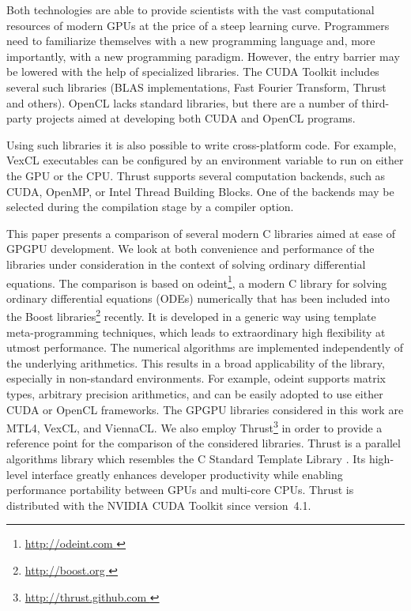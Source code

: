 \documentclass[final]{siamltex}
\newcommand{\addpp}[1]{{#1\nolinebreak[4]\hspace{-.05em}\raisebox{.4ex}{\tiny\bf ++}}\xspace}
\newcommand{\Cpp}{\addpp{C}}
\begin{document}
Both technologies are able to provide scientists with the vast computational
resources of modern GPUs at the price of a steep learning curve.  Programmers
need to familiarize themselves with a new programming language and, more
importantly, with a new programming paradigm. However, the entry barrier may be
lowered with the help of specialized libraries. The CUDA Toolkit includes
several such libraries (BLAS implementations, Fast Fourier Transform, Thrust
and others). OpenCL lacks standard libraries, but there are a number of
third-party projects aimed at developing both CUDA and OpenCL programs.

Using such libraries it is also possible to write cross-platform
code. For example, VexCL executables can be configured by an
environment variable to run on either the GPU or the CPU. Thrust supports
several computation backends, such as CUDA, OpenMP, or Intel Thread Building
Blocks. One of the backends may be selected during the compilation stage by a
compiler option.

This paper presents a comparison of several modern \Cpp libraries aimed at ease
of GPGPU development. We look at both convenience and performance of the
libraries under consideration in the context of solving ordinary differential
equations.  The comparison is based on odeint\footnote{\href{
http://odeint.com }{ http://odeint.com } }, a modern \Cpp library for solving
ordinary differential equations (ODEs) numerically  \cite{OdeintRef2,OdeintRef1}
that has been included into the Boost
libraries\footnote{ \href{ http://boost.org } { http://boost.org } } recently.
It is developed in a generic way using template meta-programming techniques,
which leads to extraordinary high flexibility at utmost performance. The
numerical algorithms are implemented independently of the underlying
arithmetics. This results in a broad applicability of the library, especially
in non-standard environments.  For example, odeint supports matrix types,
arbitrary precision arithmetics, and can be easily adopted to use either CUDA
or OpenCL frameworks.  The GPGPU libraries considered in this work are MTL4,
VexCL, and ViennaCL. We also employ Thrust\footnote{ \href{
http://thrust.github.com }{ http://thrust.github.com }} in order to provide a
reference point for the comparison of the considered libraries.
Thrust is a parallel algorithms library which resembles the \Cpp Standard
Template Library \cite{ThrustRef}.  Its high-level interface greatly
enhances developer productivity while enabling performance portability between
GPUs and multi-core CPUs.  Thrust is distributed with the NVIDIA CUDA Toolkit
since version~4.1.
\end{document}
